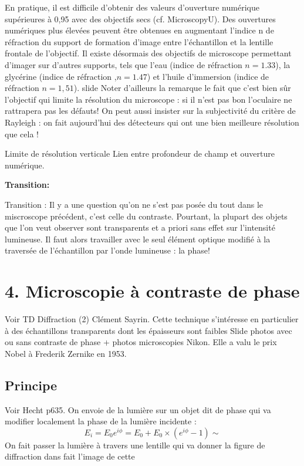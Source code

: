 \documentclass[french, a4paper, 10pt, twocolumn, landscape]{article}
\begin{document}
En pratique, il est difficile d’obtenir des valeurs d’ouverture numérique supérieures à 0,95 avec des objectifs secs
(cf. MicroscopyU). Des ouvertures numériques plus élevées peuvent être obtenues en augmentant l’indice n de réfraction
du support de formation d’image entre l’échantillon et la lentille frontale de l’objectif. Il existe désormais des
objectifs de microscope permettant d’imager sur d’autres supports, tels que l’eau (indice de réfraction $n =1.33$), la
glycérine (indice de réfraction ,$n= 1.47$) et l’huile d’immersion (indice de réfraction $n=1,51$). slide
Noter d’ailleurs la remarque le fait que c’est bien sûr l’objectif qui limite la résolution du microscope : si il n’est pas bon l’oculaire ne rattrapera pas les défauts! On peut aussi insister sur la subjectivité du critère de Rayleigh : on fait aujourd’hui des détecteurs qui ont une bien meilleure résolution que cela !

Limite de résolution verticale
Lien entre profondeur de champ et ouverture
numérique.

\textbf{Transition:}\medskip 

Transition : Il y a une question qu’on ne s’est pas posée du tout dans le miscroscope précédent, c’est celle du
contraste. Pourtant, la plupart des objets que l’on veut observer sont transparents et a priori sans effet sur l’intensité
lumineuse. Il faut alors travailler avec le seul élément optique modifié à la traversée de l’échantillon par l’onde
lumineuse : la phase!

\section*{4. Microscopie à contraste de phase}

Voir TD Diffraction (2) Clément Sayrin.
Cette technique s’intéresse en particulier à des échantillons transparents dont les
épaisseurs sont faibles Slide photos avec ou sans contraste de phase + photos
microscopies Nikon. Elle a valu le prix Nobel à Frederik Zernike en 1953.


\subsection*{Principe}
Voir Hecht p635. On envoie de la lumière sur un objet dit de phase qui va modifier localement la phase de la lumière incidente :
\begin{equation}
    E_i = E_0e^{i\phi} = E_0 + E_0\times(e^{i\phi}-1) \sim 
\end{equation}
On fait passer la lumière à travers une lentille qui va donner la figure de diffraction dans fait l'image de cette 
\end{document}

